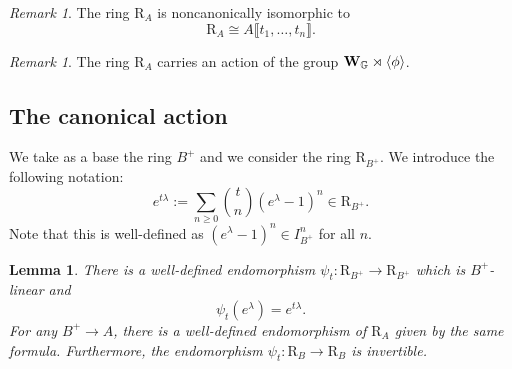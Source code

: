 \documentclass[a4paper, 10pt, oneside, reqno]{amsart}
\theoremstyle{plain}
\newtheorem{lem}[thm]{Lemma}
\theoremstyle{definition}
\theoremstyle{remark}
\newtheorem{rque}[thm]{Remark}
\newcommand{\Gbb}{\mathbb{G}}
\newcommand{\RR}{\mathrm{R}}
\begin{document}
\begin{rque}
The ring $\RR_A$ is noncanonically isomorphic to 
$$\RR_A \cong A\llbracket t_1, \dots, t_n \rrbracket.$$
\end{rque} 

\begin{rque}
The ring $\RR_A$ carries an action of the group $\Wbf_{\Gbb} \rtimes \langle \phi \rangle$.
\end{rque}

\subsection{The canonical action}
We take as a base the ring $B^+$ and we consider the ring $\RR_{B^+}$. We introduce the following notation: 
$$e^{t\lambda} := \sum_{n \geq 0}\binom{t}{n}(e^{\lambda} - 1)^n  \in \RR_{B^+}.$$
Note that this is well-defined as $(e^{\lambda} - 1)^n \in I_{B^+}^n$ for all $n$. 

\begin{lem}\label{lem:action-of-psi-t}
There is a well-defined endomorphism $\psi_t : \RR_{B^+} \to \RR_{B^+}$ which is $B^+$-linear and 
$$\psi_t(e^{\lambda}) = e^{t\lambda}.$$
For any $B^+ \to A$, there is a well-defined endomorphism of $\RR_A$ given by the same formula. Furthermore, the endomorphism $\psi_t : \RR_B \to \RR_B$ is invertible. 
\end{lem}
\end{document}
